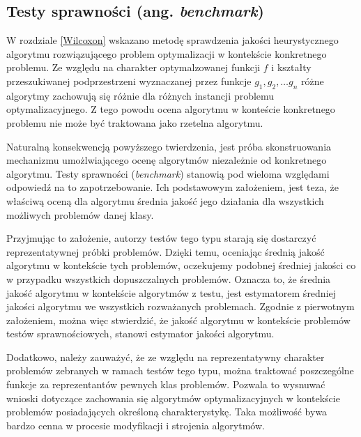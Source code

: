 \documentclass[12pt,a4paper]{report}
\begin{document}
{{{\subsection{Testy sprawności (ang. \emph{benchmark})}
\par{
W rozdziale \ref{Wilcoxon} wskazano metodę sprawdzenia jakości heurystycznego algorytmu rozwiązującego problem optymalizacji w kontekście konkretnego problemu. Ze względu na charakter optymalzowanej funkcji $f$ i kształty przeszukiwanej podprzestrzeni wyznaczanej przez funkcje $g_1,g_2, \ldots g_n$ różne algorytmy zachowują się różnie dla różnych instancji problemu optymalizacyjnego. Z tego powodu ocena algorytmu w konteście konkretnego problemu nie może być traktowana jako rzetelna algorytmu.
}
\par{
Naturalną konsekwencją powyższego twierdzenia, jest próba skonstruowania mechanizmu umożlwiającego ocenę algorytmów niezależnie od konkretnego algorytmu. Testy sprawności (\emph{benchmark}) stanowią pod wieloma względami odpowiedź na to zapotrzebowanie. Ich podstawowym założeniem, jest teza, że właściwą oceną dla algorytmu średnia jakość jego działania dla wszystkich możliwych problemów danej klasy.
}
\par{
Przyjmując to założenie, autorzy testów tego typu starają się dostarczyć reprezentatywnej próbki problemów. Dzięki temu, oceniając średnią jakość algorytmu w kontekście tych problemów, oczekujemy podobnej średniej jakości co w przypadku wszystkich dopuszczalnych problemów. Oznacza to, że średnia jakość algorytmu w kontekście algorytmów z testu, jest estymatorem średniej jakości algorytmu we wszystkich rozważanych problemach. Zgodnie z pierwotnym założeniem, można więc stwierdzić, że jakość algorytmu w kontekście problemów testów sprawnościowych, stanowi estymator jakości algorytmu.
}
\par{
Dodatkowo, należy zauważyć, że ze względu na reprezentatywny charakter problemów zebranych w ramach testów tego typu, można traktować poszczególne funkcje za reprezentantów pewnych klas problemów. Pozwala to wysnuwać wnioski dotyczące zachowania się algorytmów optymalizacyjnych w kontekście problemów posiadających określoną charakterystykę. Taka możliwość bywa bardzo cenna w procesie modyfikacji i strojenia algorytmów.
}
}}}
\end{document}
